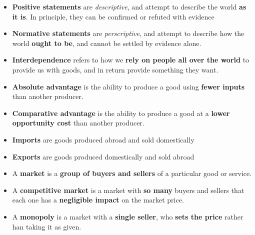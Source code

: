 \documentclass[12pt,a4paper]{article}
\begin{document}

\begin{itemize}
    \item \textbf{Positive statements} are \textit{descriptive}, and attempt to describe the world \textbf{as it is}. In principle, they can be confirmed or refuted with evidence
    \item \textbf{Normative statements} are \textit{perscriptive}, and attempt to describe how the world \textbf{ought to be}, and cannot be settled by evidence alone.
\end{itemize}

\newpage


\begin{itemize}
    \item \textbf{Interdependence} refers to how we \textbf{rely on people all over the world} to provide us with goods, and in return provide something they want.
    \item \textbf{Absolute advantage} is the ability to produce a good using \textbf{fewer inputs} than another producer.
    \item \textbf{Comparative advantage} is the ability to produce a good at a \textbf{lower opportunity cost} than another producer.
    \item \textbf{Imports} are goods produced abroad and sold domestically
    \item \textbf{Exports} are goods produced domestically and sold abroad
\end{itemize}

\newpage



\begin{itemize}
    \item A \textbf{market} is a \textbf{group of buyers and sellers} of a particular good or service.
    \item A \textbf{competitive market} is a market with \textbf{so many} buyers and sellers that each one has a \textbf{negligible impact} on the market price.
    \item A \textbf{monopoly} is a market with a \textbf{single seller}, who \textbf{sets the price} rather han taking it as given.
\end{itemize}
\end{document}
